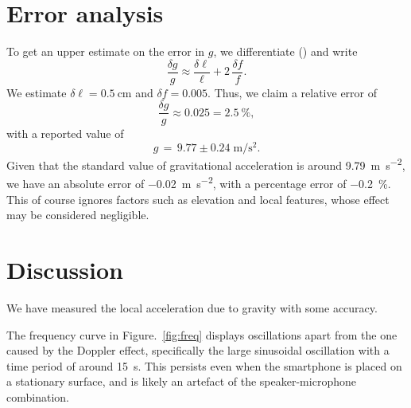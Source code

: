 \documentclass[11pt]{article}
\begin{document}
    \section{Error analysis}
    To get an upper estimate on the error in $g$, we differentiate (\star) and write
    \[
    \frac{\delta g}{g} \approx \frac{\delta\ell}{\ell} + 2\,\frac{\delta f}{f}.
    \] We estimate $\delta\ell = \SI{0.5}{\cm}$ and $\delta f = 0.005$.
    Thus, we claim a relative error of \[
        \frac{\delta g}{g} \approx 0.025 = \SI{2.5}{\percent},
    \] with a reported value of \[
        g \,=\, {9.77 \pm 0.24}\;\si{\m\per\s^2}.
    \] Given that the standard value of gravitational acceleration is around
    \SI{9.79}{\m\per\s^2}, we have an absolute error of \SI{-0.02}{\m\per\s^2}, with
    a percentage error of \SI{-0.2}{\percent}. This of course ignores factors such
    as elevation and local features, whose effect may be considered negligible.
    
    \section{Discussion}
    We have measured the local acceleration due to gravity with some accuracy.

    The frequency curve in Figure.~\ref{fig:freq} displays oscillations apart from
    the one caused by the Doppler effect, specifically the large sinusoidal
    oscillation with a time period of around \SI{15}{\s}. This persists even when
    the smartphone is placed on a stationary surface, and is likely an artefact of
    the speaker-microphone combination.
    
    
\end{document}
